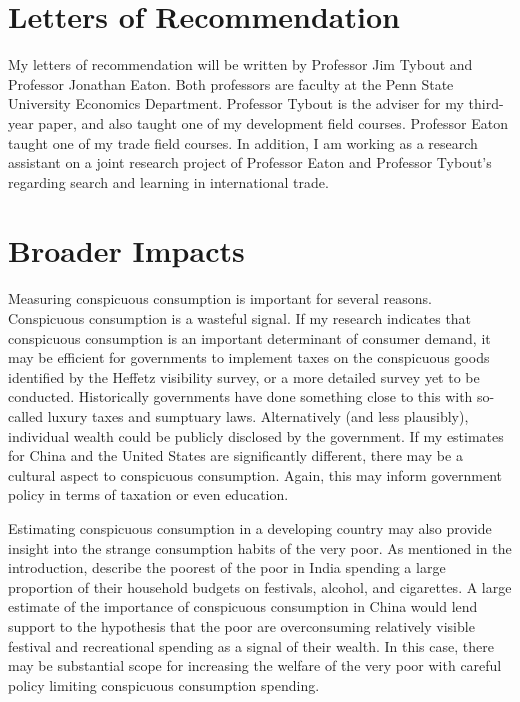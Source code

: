 \documentclass[a4paper,10pt]{article}
\begin{document}
\section{Letters of Recommendation}
My letters of recommendation will be written by Professor Jim Tybout and Professor Jonathan Eaton. Both professors are faculty at the Penn State University Economics Department.  Professor Tybout is the adviser for my third-year paper, and also taught one of my development field courses.  Professor Eaton taught one of my trade field courses.  In addition, I am working as a research assistant on a joint research project of Professor Eaton and Professor Tybout's regarding search and learning in international trade.

\section{Broader Impacts}
Measuring conspicuous consumption is important for several reasons.  Conspicuous consumption is a wasteful signal.  If my research indicates that conspicuous consumption is an important determinant of consumer demand, it may be efficient for governments to implement taxes on the conspicuous goods identified by the Heffetz visibility survey, or a more detailed survey yet to be conducted.  Historically governments have done something close to this with so-called luxury taxes and sumptuary laws.  Alternatively (and less plausibly), individual wealth could be publicly disclosed by the government.  If my estimates for China and the United States are significantly different, there may be a cultural aspect to conspicuous consumption.  Again, this may inform government policy in terms of taxation or even education.

Estimating conspicuous consumption in a developing country may also provide insight into the strange consumption habits of the very poor.  As mentioned in the introduction, \citet{BanerjeeDuflo2007} describe the poorest of the poor in India spending a large proportion of their household budgets on festivals, alcohol, and cigarettes.  A large estimate of the importance of conspicuous consumption in China would lend support to the hypothesis that the poor are overconsuming relatively visible festival and recreational spending as a signal of their wealth.  In this case, there may be substantial scope for increasing the welfare of the very poor with careful policy limiting conspicuous consumption spending.      
\end{document}
